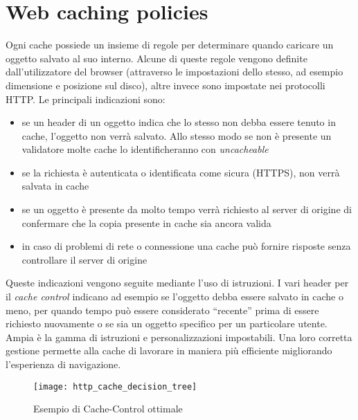 \section{Web caching policies}

Ogni cache possiede un insieme di regole per determinare quando caricare un oggetto salvato al suo interno. Alcune di queste regole vengono definite dall'utilizzatore del browser (attraverso le impostazioni dello stesso, ad esempio dimensione e posizione sul disco), altre invece sono impostate nei protocolli HTTP.
Le principali indicazioni sono:

\begin{itemize}
	
	\item{se un header di un oggetto indica che lo stesso non debba essere tenuto in cache, l'oggetto non verrà salvato. Allo stesso modo se non è presente un validatore molte cache lo identificheranno con \textit{uncacheable}}
	
	\item{se la richiesta è autenticata o identificata come sicura (HTTPS), non verrà salvata in cache}
	
	\item{se un oggetto è presente da molto tempo verrà richiesto al server di origine di confermare che la copia presente in cache sia ancora valida}
	
	\item{in caso di problemi di rete o connessione una cache può fornire risposte senza controllare il server di origine} 
	
\end{itemize}

Queste indicazioni vengono seguite mediante l'uso di istruzioni. I vari header per il \textit{cache control} indicano ad esempio se l'oggetto debba essere salvato in cache o meno, per quando tempo può essere considerato ``recente'' prima di essere richiesto nuovamente o se sia un oggetto specifico per un particolare utente. Ampia è la gamma di istruzioni e personalizzazioni impostabili. Una loro corretta gestione permette alla cache di lavorare in maniera più efficiente migliorando l'esperienza di navigazione.

\begin{figure}[htpb]
	\begin{center}
		\texttt{[image: http\_cache\_decision\_tree]}
	\end{center}
	\caption[Esempio di Cache-Control ottimale]{Esempio di Cache-Control ottimale \footnotemark}
\end{figure}

